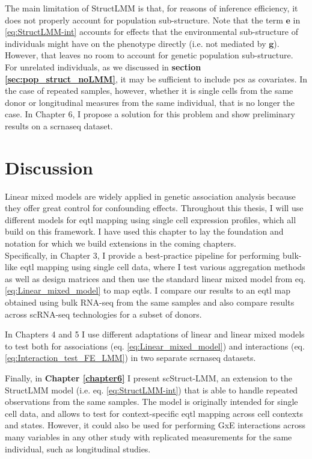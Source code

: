The main limitation of StructLMM is that, for reasons of inference efficiency, it does not properly account for population sub-structure.
Note that the term $\mathbf{e}$ in \eqref{eq:StructLMM-int} accounts for effects that the environmental sub-structure of individuals might have on the phenotype directly (i.e. not mediated by $\mathbf{g}$).
However, that leaves no room to account for genetic population sub-structure.
For unrelated individuals, as we discussed in \textbf{section \ref{sec:pop_struct_noLMM}}, it may be sufficient to include \glspl{pc} as covariates.
In the case of repeated samples, however, whether it is single cells from the same donor or longitudinal measures from the same individual, that is no longer the case.
In Chapter 6, I propose a solution for this problem and 
show preliminary results on a \gls{scrnaseq} dataset.



\section{Discussion}

Linear mixed models are widely applied in genetic association analysis because they offer great control for confounding effects.
Throughout this thesis, I will use different models for \gls{eqtl} mapping using single cell expression profiles, which all build on this framework.
I have used this chapter to lay the foundation and notation for which we build extensions in the coming chapters.\\

Specifically, in Chapter 3, I provide a best-practice pipeline for performing bulk-like \gls{eqtl} mapping using single cell data, where I test various aggregation methods as well as design matrices and then use the standard linear mixed model from eq. \eqref{eq:Linear_mixed_model} to map \glspl{eqtl}.
I compare our results to an \gls{eqtl} map obtained using bulk RNA-seq from the same samples and also compare results across scRNA-seq technologies for a subset of donors.

In Chapters 4 and 5 I use different adaptations of linear and linear mixed models to test both for associations (eq. \eqref{eq:Linear_mixed_model}) and interactions (eq. \eqref{eq:Interaction_test_FE_LMM}) in two separate \gls{scrnaseq} datasets. 

Finally, in \textbf{Chapter 
\ref{chapter6}} I present scStruct-LMM, an extension to the StructLMM model (i.e. eq. \eqref{eq:StructLMM-int}) that is able to handle repeated observations from the same samples.
The model is originally intended for single cell data, and allows to test for context-specific \gls{eqtl} mapping across cell contexts and states.
However, it could also be used for performing GxE interactions across many variables in any other study with replicated measurements for the same individual, such as longitudinal studies.